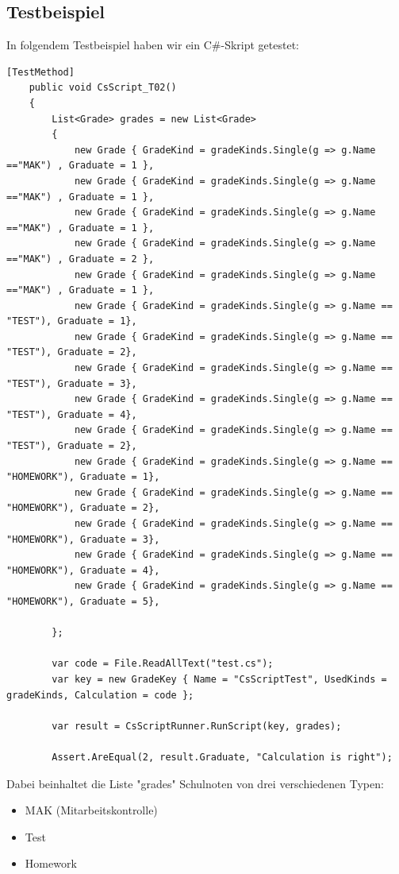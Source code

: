 \newpage
\subsection*{Testbeispiel}

In folgendem Testbeispiel haben wir ein C\#-Skript getestet:

\begin{lstlisting}[language={[Sharp]C},caption=Test for CsharpScripting,label=lst:impl:csc]
[TestMethod]
    public void CsScript_T02()
    {
        List<Grade> grades = new List<Grade>
        {
            new Grade { GradeKind = gradeKinds.Single(g => g.Name =="MAK") , Graduate = 1 },
            new Grade { GradeKind = gradeKinds.Single(g => g.Name =="MAK") , Graduate = 1 },
            new Grade { GradeKind = gradeKinds.Single(g => g.Name =="MAK") , Graduate = 1 },
            new Grade { GradeKind = gradeKinds.Single(g => g.Name =="MAK") , Graduate = 2 },
            new Grade { GradeKind = gradeKinds.Single(g => g.Name =="MAK") , Graduate = 1 },
            new Grade { GradeKind = gradeKinds.Single(g => g.Name == "TEST"), Graduate = 1},
            new Grade { GradeKind = gradeKinds.Single(g => g.Name == "TEST"), Graduate = 2},
            new Grade { GradeKind = gradeKinds.Single(g => g.Name == "TEST"), Graduate = 3},
            new Grade { GradeKind = gradeKinds.Single(g => g.Name == "TEST"), Graduate = 4},
            new Grade { GradeKind = gradeKinds.Single(g => g.Name == "TEST"), Graduate = 2},
            new Grade { GradeKind = gradeKinds.Single(g => g.Name == "HOMEWORK"), Graduate = 1},
            new Grade { GradeKind = gradeKinds.Single(g => g.Name == "HOMEWORK"), Graduate = 2},
            new Grade { GradeKind = gradeKinds.Single(g => g.Name == "HOMEWORK"), Graduate = 3},
            new Grade { GradeKind = gradeKinds.Single(g => g.Name == "HOMEWORK"), Graduate = 4},
            new Grade { GradeKind = gradeKinds.Single(g => g.Name == "HOMEWORK"), Graduate = 5},

        };

        var code = File.ReadAllText("test.cs");
        var key = new GradeKey { Name = "CsScriptTest", UsedKinds = gradeKinds, Calculation = code };

        var result = CsScriptRunner.RunScript(key, grades);

        Assert.AreEqual(2, result.Graduate, "Calculation is right");
\end{lstlisting}

Dabei beinhaltet die Liste "grades" Schulnoten von drei verschiedenen Typen:
\begin{itemize}
    \item MAK (Mitarbeitskontrolle)
    \item Test
    \item Homework
\end{itemize}



